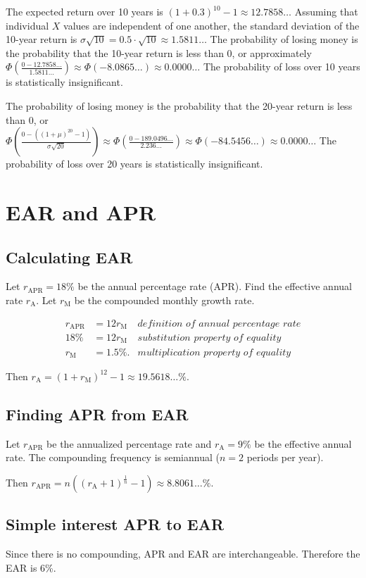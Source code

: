 \documentclass[12pt]{article}
\begin{document}
The expected return over 10 years is $(1+0.3)^{10}-1\approx 12.7858\dots$ Assuming that individual $X$ values are independent of one another, the standard deviation of the 10-year return is $\sigma\sqrt{10}=0.5\cdot\sqrt{10}\approx 1.5811\dots$ The probability of losing money is the probability that the 10-year return is less than 0, or approximately $\Phi\left(\frac{0-12.7858\dots}{1.5811\dots}\right)\approx\Phi(-8.0865\dots)\approx 0.0000\dots$ The probability of loss over 10 years is statistically insignificant.

The probability of losing money is the probability that the 20-year return is less than 0, or $\Phi\left(\frac{0-\left((1+\mu)^{20}-1\right)}{\sigma\sqrt{20}}\right)\approx\Phi\left(\frac{0-189.0496\dots}{2.236\dots}\right)\approx\Phi(-84.5456\dots)\approx 0.0000\dots$ The probability of loss over 20 years is statistically insignificant.
\section{EAR and APR}
\subsection{Calculating EAR}
Let $r_{\mathrm{APR}}=18\%$ be the annual percentage rate (APR). Find the effective annual rate $r_{\mathrm{A}}$. Let $r_{\mathrm{M}}$ be the compounded monthly growth rate.

\begin{align*}
r_{\mathrm{APR}}&=12r_{\mathrm{M}}&\textit{definition of annual percentage rate}\\
18\%&=12r_{\mathrm{M}}&\textit{substitution property of equality}\\
r_{\mathrm{M}}&=1.5\%.&\textit{multiplication property of equality}
\end{align*}

Then $r_{\mathrm{A}}=(1+r_{\mathrm{M}})^{12}-1\approx 19.5618\dots\%$.
\subsection{Finding APR from EAR}
Let $r_{\mathrm{APR}}$ be the annualized percentage rate and $r_{\mathrm{A}}=9\%$ be the effective annual rate. The compounding frequency is semiannual ($n=2$ periods per year).

Then $r_{\mathrm{APR}}=n\left((r_{\mathrm{A}}+1)^{\frac{1}{n}}-1\right)\approx 8.8061\dots\%.$
\subsection{Simple interest APR to EAR}
Since there is no compounding, APR and EAR are interchangeable. Therefore the EAR is 6\%. 
\end{document}
